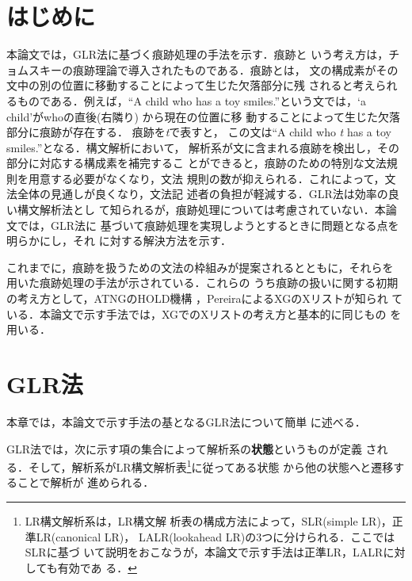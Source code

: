 

\maketitle


\section{はじめに}

本論文では，GLR法\cite{Tomita1987}に基づく痕跡処理の手法を示す．痕跡と
いう考え方は，チョムスキーの痕跡理論で導入されたものである．痕跡とは，
文の構成素がその文中の別の位置に移動することによって生じた欠落部分に残
されると考えられるものである．例えば，``A child who has a toy
smiles.''という文では，`a child'がwhoの直後(右隣り) から現在の位置に移
動することによって生じた欠落部分に痕跡が存在する． 痕跡を{\it t}で表すと，
この文は``A child who {\it t} has a toy smiles.''となる．構文解析において，
解析系が文に含まれる痕跡を検出し，その部分に対応する構成素を補完するこ
とができると，痕跡のための特別な文法規則を用意する必要がなくなり，文法
規則の数が抑えられる．これによって，文法全体の見通しが良くなり，文法記
述者の負担が軽減する\cite{Konno1986}．GLR法は効率の良い構文解析法とし
て知られるが，痕跡処理については考慮されていない．本論文では，GLR法に
基づいて痕跡処理を実現しようとするときに問題となる点を明らかにし，それ
に対する解決方法を示す．

これまでに，痕跡を扱うための文法の枠組みが提案されるとともに，それらを
用いた痕跡処理の手法が示されている\cite[など]
{Pereira1981,Konno1986,Hayashi1988,Tokunaga1990,Haruno1992}．これらの
うち痕跡の扱いに関する初期の考え方として，ATNGのHOLD機構
\cite{Wanner1978}，PereiraによるXGのXリスト\cite{Pereira1981}が知られ
ている．本論文で示す手法では，XGでのXリストの考え方と基本的に同じもの
を用いる．


\section{GLR法}

本章では，本論文で示す手法の基となるGLR法\cite{Tomita1987}について簡単
に述べる．

GLR法では，次に示す項の集合によって解析系の{\bf 状態}というものが定義
される．そして，解析系がLR構文解析表\footnote{LR構文解析系は，LR構文解
析表の構成方法によって，SLR(simple LR)，正準LR(canonical LR)，
LALR(lookahead LR)の3つに分けられる\cite{Aho1986}．ここではSLRに基づ
いて説明をおこなうが，本論文で示す手法は正準LR，LALRに対しても有効であ
る．}に従ってある状態 から他の状態へと遷移することで解析が
進められる．

